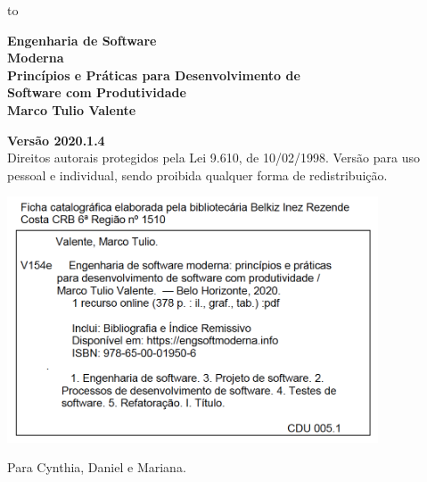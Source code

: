 \thispagestyle{empty}

\begin{titlepage}

\vspace*{-38mm}
  \noindent\vbox to 
\end{titlepage}

\newpage
\thispagestyle{empty}
\vspace*{4cm}
\begin{center}
{\Huge \bf  Engenharia de Software\\[.3cm] Moderna}\\ 
\vspace*{1cm}
{\Large \bf  Princípios e Práticas para Desenvolvimento de\\[.3cm] Software com Produtividade}\\ 
\vspace*{3cm}
{\Large \bf Marco Tulio Valente}
\end{center}
\newpage

\newpage
\thispagestyle{empty}
\vspace*{3cm}
\begin{center}
{\Large \bf  Versão 2020.1.4}\\ 
\vspace*{1cm}
{\large Direitos autorais protegidos pela Lei 9.610, de 10/02/1998. Versão para  uso pessoal e individual, sendo proibida qualquer forma de redistribuição.}
\end{center}

\vspace*{3cm}
\begin{center}
\includegraphics[width=11cm]{figs/capa/ficha-catalografica.png}
\end{center}

\newpage

\newpage
\thispagestyle{empty}
\vspace*{5cm}
\begin{center}
\large Para Cynthia, Daniel e Mariana.
\end{center}

\newpage
\newpage

\tableofcontents
